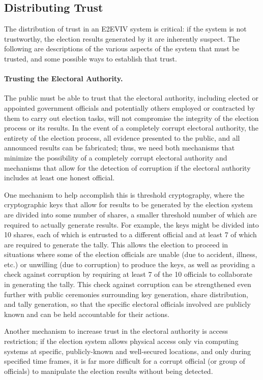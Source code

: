 \subsection{Distributing Trust}
\label{sec:trust}

The distribution of trust in an E2EVIV system is critical: if the
system is not trustworthy, the election results generated by it are
inherently suspect. The following are descriptions of the various
aspects of the system that must be trusted, and some possible ways to
establish that trust.

\paragraph{Trusting the Electoral Authority.} The public must be able
to trust that the electoral authority, including elected or appointed
government officials and potentially others employed or contracted by
them to carry out election tasks, will not compromise the integrity of
the election process or its results. In the event of a completely
corrupt electoral authority, the entirety of the election process, all
evidence presented to the public, and all announced results can be
fabricated; thus, we need both mechanisms that minimize the
possibility of a completely corrupt electoral authority and mechanisms
that allow for the detection of corruption if the electoral authority
includes at least one honest official.

One mechanism to help accomplish this is threshold cryptography, where
the cryptographic keys that allow for results to be generated by the
election system are divided into some number of shares, a smaller
threshold number of which are required to actually generate
results. For example, the keys might be divided into 10 shares, each
of which is entrusted to a different official and at least 7 of which
are required to generate the tally. This allows the election to
proceed in situations where some of the election officials are unable
(due to accident, illness, etc.) or unwilling (due to corruption) to
produce the keys, as well as providing a check against corruption by
requiring at least 7 of the 10 officials to collaborate in generating
the tally. This check against corruption can be strengthened even
further with public ceremonies surrounding key generation, share
distribution, and tally generation, so that the specific electoral
officials involved are publicly known and can be held accountable for
their actions.

Another mechanism to increase trust in the electoral authority is
access restriction; if the election system allows physical access only
via computing systems at specific, publicly-known and well-secured
locations, and only during specified time frames, it is far more
difficult for a corrupt official (or group of officials) to manipulate
the election results without being detected.

